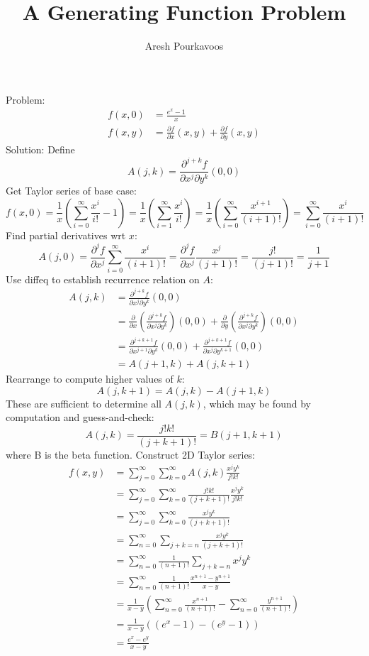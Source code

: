 \documentclass{article}
\begin{document}
\title{A Generating Function Problem}
\author{Aresh Pourkavoos}
\maketitle

Problem:
\begin{align*}
  f(x, 0) &= \frac{e^x-1}{x} \\
  f(x, y) &= \frac{\partial f}{\partial x}(x, y)+\frac{\partial f}{\partial y}(x, y)
\end{align*}
Solution: Define
\[A(j, k) = \frac{\partial^{j+k} f}{\partial x^j \partial y^k}(0, 0)\]
Get Taylor series of base case:
\[f(x, 0)
= \frac{1}{x} \left(\sum_{i=0}^\infty \frac{x^i}{i!}-1\right)
= \frac{1}{x} \left(\sum_{i=1}^\infty \frac{x^i}{i!}\right)
= \frac{1}{x} \left(\sum_{i=0}^\infty \frac{x^{i+1}}{(i+1)!}\right)
= \sum_{i=0}^\infty \frac{x^i}{(i+1)!}\]
Find partial derivatives wrt $x$:
\[A(j, 0)
= \frac{\partial^j f}{\partial x^j} \sum_{i=0}^\infty \frac{x^i}{(i+1)!}
= \frac{\partial^j f}{\partial x^j} \frac{x^j}{(j+1)!}
= \frac{j!}{(j+1)!}
= \frac{1}{j+1}\]
Use diffeq to establish recurrence relation on $A$:
\begin{align*}
  A(j, k)
  &= \frac{\partial^{j+k} f}{\partial x^j \partial y^k}(0, 0) \\
  &= \frac{\partial}{\partial x}\left(\frac{\partial^{j+k} f}{\partial x^j \partial y^k}\right)(0, 0)
  + \frac{\partial}{\partial y}\left(\frac{\partial^{j+k} f}{\partial x^j\partial y^k}\right)(0, 0) \\
  &= \frac{\partial^{j+k+1} f}{\partial x^{j+1} \partial y^k}(0, 0)
  + \frac{\partial^{j+k+1} f}{\partial x^j \partial y^{k+1}}(0, 0) \\
  &= A(j+1, k)+A(j, k+1)
\end{align*}
Rearrange to compute higher values of $k$:
\[A(j, k+1) = A(j, k)-A(j+1, k)\]
These are sufficient to determine all $A(j, k)$,
which may be found by computation and guess-and-check:
\[A(j, k) = \frac{j!k!}{(j+k+1)!} = B(j+1, k+1)\]
where B is the beta function. Construct 2D Taylor series:
\begin{align*}
  f(x, y)
  &= \sum_{j=0}^\infty \sum_{k=0}^\infty A(j, k) \frac{x^jy^k}{j!k!} \\
  &= \sum_{j=0}^\infty \sum_{k=0}^\infty \frac{j!k!}{(j+k+1)!} \frac{x^jy^k}{j!k!} \\
  &= \sum_{j=0}^\infty \sum_{k=0}^\infty \frac{x^jy^k}{(j+k+1)!} \\
  &= \sum_{n=0}^\infty \sum_{j+k=n} \frac{x^jy^k}{(j+k+1)!} \\
  &= \sum_{n=0}^\infty \frac{1}{(n+1)!}\sum_{j+k=n} x^jy^k \\
  &= \sum_{n=0}^\infty \frac{1}{(n+1)!}\frac{x^{n+1}-y^{n+1}}{x-y} \\
  &= \frac{1}{x-y}\left(
  \sum_{n=0}^\infty \frac{x^{n+1}}{(n+1)!}-\sum_{n=0}^\infty \frac{y^{n+1}}{(n+1)!}
  \right) \\
  &= \frac{1}{x-y}((e^x-1)-(e^y-1)) \\
  &= \frac{e^x-e^y}{x-y}
\end{align*}
\end{document}
